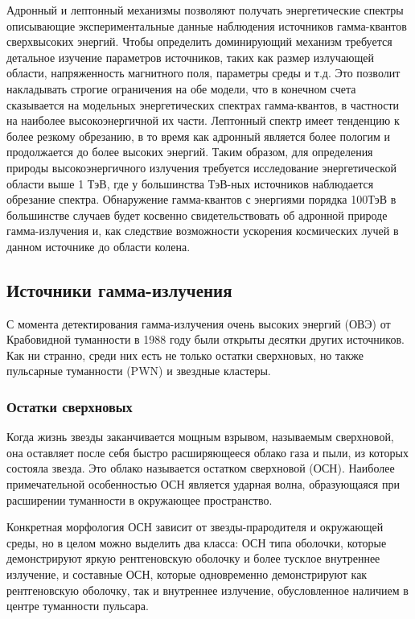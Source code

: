 Адронный и лептонный механизмы позволяют получать энергетические спектры описывающие экспериментальные данные наблюдения источников гамма-квантов сверхвысоких энергий. Чтобы определить доминирующий механизм требуется детальное изучение параметров источников, таких как размер излучающей области, напряженность магнитного поля, параметры среды и т.д. Это позволит накладывать строгие ограничения на обе модели, что в конечном счета сказывается на модельных энергетических спектрах гамма-квантов, в частности на наиболее высокоэнергичной их части.  Лептонный спектр имеет тенденцию к более резкому обрезанию, в то время как адронный является более пологим и продолжается до более высоких энергий. Таким образом, для определения природы высокоэнергичного излучения требуется исследование энергетической области выше 1 ТэВ, где у большинства ТэВ-ных источников наблюдается обрезание спектра. Обнаружение гамма-квантов с энергиями порядка 100ТэВ в большинстве случаев будет косвенно свидетельствовать об адронной природе гамма-излучения и, как следствие возможности ускорения космических лучей в данном источнике до области колена.

\subsection{Источники гамма-излучения}
С момента детектирования гамма-излучения очень высоких энергий (ОВЭ) от Крабовидной туманности в 1988 году были открыты десятки других источников. Как ни странно, среди них есть не только остатки сверхновых, но также пульсарные туманности (PWN) и звездные кластеры.

\subsubsection{Остатки сверхновых}
Когда жизнь звезды заканчивается мощным взрывом, называемым сверхновой, она оставляет после себя быстро расширяющееся облако газа и пыли, из которых состояла звезда. Это облако называется остатком сверхновой (ОСН). Наиболее примечательной особенностью ОСН является ударная волна, образующаяся при расширении туманности в окружающее пространство.

Конкретная морфология ОСН зависит от звезды-прародителя и окружающей среды, но в целом можно выделить два класса: ОСН типа оболочки, которые демонстрируют яркую рентгеновскую оболочку и более тусклое внутреннее излучение, и составные ОСН, которые одновременно демонстрируют как рентгеновскую оболочку, так и внутреннее излучение, обусловленное наличием в центре туманности пульсара. 

